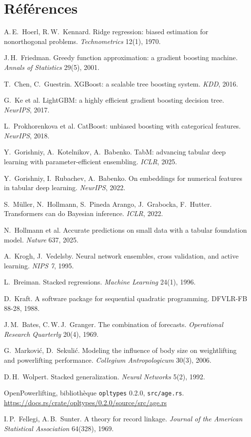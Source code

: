 \documentclass[11pt,a4paper]{article}
\newcommand{\code}[1]{\texttt{\small #1}}
\newcounter{tab}
\begin{document}
{\small
\section*{Références}
\begin{enumerate}[label={[\arabic*]},leftmargin=2.2em]
\item A.\,E.~Hoerl, R.\,W.~Kennard. Ridge regression: biased estimation for nonorthogonal problems. \emph{Technometrics} 12(1), 1970.
\item J.\,H.~Friedman. Greedy function approximation: a gradient boosting machine. \emph{Annals of Statistics} 29(5), 2001.
\item T.~Chen, C.~Guestrin. XGBoost: a scalable tree boosting system. \emph{KDD}, 2016.
\item G.~Ke et al. LightGBM: a highly efficient gradient boosting decision tree. \emph{NeurIPS}, 2017.
\item L.~Prokhorenkova et al. CatBoost: unbiased boosting with categorical features. \emph{NeurIPS}, 2018.
\item Y.~Gorishniy, A.~Kotelnikov, A.~Babenko. TabM: advancing tabular deep learning with parameter-efficient ensembling. \emph{ICLR}, 2025.
\item Y.~Gorishniy, I.~Rubachev, A.~Babenko. On embeddings for numerical features in tabular deep learning. \emph{NeurIPS}, 2022.
\item S.~Müller, N.~Hollmann, S.~Pineda Arango, J.~Grabocka, F.~Hutter. Transformers can do Bayesian inference. \emph{ICLR}, 2022.
\item N.~Hollmann et al. Accurate predictions on small data with a tabular foundation model. \emph{Nature} 637, 2025.
\item A.~Krogh, J.~Vedelsby. Neural network ensembles, cross validation, and active learning. \emph{NIPS 7}, 1995.
\item L.~Breiman. Stacked regressions. \emph{Machine Learning} 24(1), 1996.
\item D.~Kraft. A software package for sequential quadratic programming. DFVLR-FB 88-28, 1988.
\item J.\,M.~Bates, C.\,W.\,J.~Granger. The combination of forecasts. \emph{Operational Research Quarterly} 20(4), 1969.
\item G.~Marković, D.~Sekulić. Modeling the influence of body size on weightlifting and powerlifting performance. \emph{Collegium Antropologicum} 30(3), 2006.
\item D.\,H.~Wolpert. Stacked generalization. \emph{Neural Networks} 5(2), 1992.
\item OpenPowerlifting, bibliothèque \code{opltypes} 0.2.0, \code{src/age.rs}. \url{https://docs.rs/crate/opltypes/0.2.0/source/src/age.rs}
\item I.\,P.~Fellegi, A.\,B.~Sunter. A theory for record linkage. \emph{Journal of the American Statistical Association} 64(328), 1969.
\end{enumerate}
\par}
\end{document}
